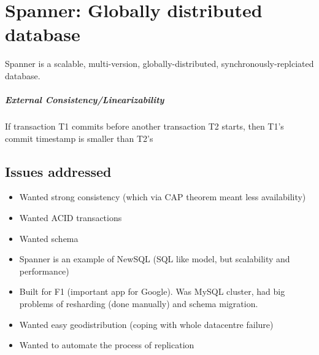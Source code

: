 \chapter{Spanner: Globally distributed database}

Spanner is a scalable, multi-version, globally-distributed, synchronously-replciated database.

\paragraph{External Consistency/Linearizability} If transaction T1 commits before another transaction T2 starts, then T1's commit timestamp is smaller than T2's


\section{Issues addressed} 
\begin{itemize}
    \item Wanted strong consistency (which via CAP theorem meant less availability)
    \item Wanted ACID transactions
    \item Wanted schema
    \item Spanner is an example of NewSQL (SQL like model, but scalability and performance)
    \item Built for F1 (important app for Google). Was MySQL cluster, had big problems of resharding (done manually) and schema migration.
    \item Wanted easy geodistribution (coping with whole datacentre failure)
    \item Wanted to automate the process of replication
\end{itemize}


